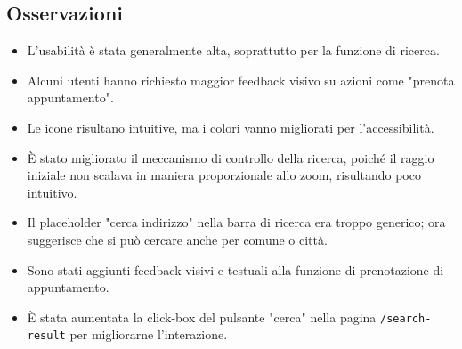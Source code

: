 \subsection{Osservazioni}

\begin{itemize}
  \item L’usabilità è stata generalmente alta, soprattutto per la funzione di ricerca.
  \item Alcuni utenti hanno richiesto maggior feedback visivo su azioni come "prenota appuntamento".
  \item Le icone risultano intuitive, ma i colori vanno migliorati per l’accessibilità.
  \item È stato migliorato il meccanismo di controllo della ricerca, poiché il raggio iniziale non scalava in maniera proporzionale allo zoom, risultando poco intuitivo.
  \item Il placeholder "cerca indirizzo" nella barra di ricerca era troppo generico; ora suggerisce che si può cercare anche per comune o città.
  \item Sono stati aggiunti feedback visivi e testuali alla funzione di prenotazione di appuntamento.
  \item È stata aumentata la click-box del pulsante "cerca" nella pagina \texttt{/search-result} per migliorarne l’interazione.
\end{itemize}